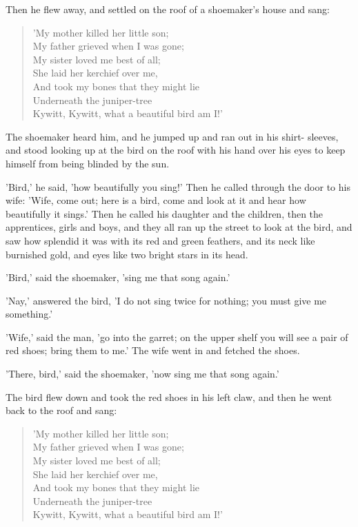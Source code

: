 \documentclass[12pt]{book}
\begin{document}
Then he flew away, and settled on the roof of a shoemaker's house and
sang:

\begin{verse}
 'My mother killed her little son;\\
  My father grieved when I was gone;\\
  My sister loved me best of all;\\
  She laid her kerchief over me,\\
  And took my bones that they might lie\\
  Underneath the juniper-tree\\
  Kywitt, Kywitt, what a beautiful bird am I!'
\end{verse}

The shoemaker heard him, and he jumped up and ran out in his shirt-
sleeves, and stood looking up at the bird on the roof with his hand
over his eyes to keep himself from being blinded by the sun.

'Bird,' he said, 'how beautifully you sing!' Then he called through
the door to his wife: 'Wife, come out; here is a bird, come and look
at it and hear how beautifully it sings.' Then he called his daughter
and the children, then the apprentices, girls and boys, and they all
ran up the street to look at the bird, and saw how splendid it was
with its red and green feathers, and its neck like burnished gold, and
eyes like two bright stars in its head.

'Bird,' said the shoemaker, 'sing me that song again.'

'Nay,' answered the bird, 'I do not sing twice for nothing; you must
give me something.'

'Wife,' said the man, 'go into the garret; on the upper shelf you will
see a pair of red shoes; bring them to me.' The wife went in and
fetched the shoes.

'There, bird,' said the shoemaker, 'now sing me that song again.'

The bird flew down and took the red shoes in his left claw, and then
he went back to the roof and sang:

\begin{verse}
 'My mother killed her little son;\\
  My father grieved when I was gone;\\
  My sister loved me best of all;\\
  She laid her kerchief over me,\\
  And took my bones that they might lie\\
  Underneath the juniper-tree\\
  Kywitt, Kywitt, what a beautiful bird am I!'
\end{verse}
\end{document}

